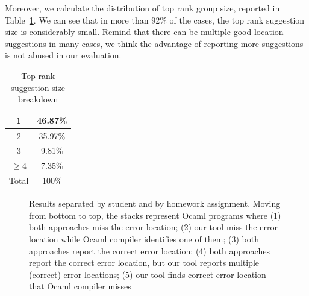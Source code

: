 Moreover, we calculate the distribution of top rank group size,
reported in Table~\ref{table:groupsize}. We can see that in more than
$92\%$ of the cases, the top rank suggestion size is considerably
small. Remind that there can be multiple good location suggestions in
many cases, we think the advantage of reporting more suggestions is
not abused in our evaluation.

\begin{table}
\begin{tabular}{|c | c|}
\hline
1 & 46.87\% \\
\hline
2 & 35.97\% \\
\hline
3 & 9.81\% \\
\hline
$\geq 4$ & 7.35\% \\
\hline
Total & 100\% \\
\hline
\end{tabular}
\label{table:groupsize}
\caption{Top rank suggestion size breakdown}
\end{table}

\begin{figure}
\begin{center}
%
\end{center}
\caption{Results separated by student and by homework assignment.
Moving from bottom to top, the stacks represent Ocaml programs where
%
(1) both approaches miss the error location; 
%
(2) our tool miss the error location while Ocaml compiler identifies
one of them; 
%
(3) both approaches report the correct error location; 
%
(4) both approaches report the correct error location, but our tool
reports multiple (correct) error locations; 
%
(5) our tool finds correct error location that Ocaml compiler misses} 
\label{fig:ocamlresult}
\end{figure}

